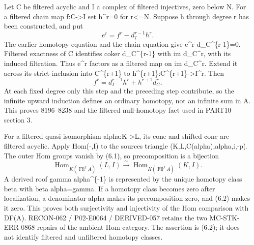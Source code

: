 \documentclass[11pt]{article}
\begin{document}
Let C be filtered acyclic and I a complex of filtered injectives,\allowbreak{} zero below N. For a filtered chain map f:\allowbreak{}C\allowbreak{}->I set h\textasciicircum{}r\allowbreak{}=0 for r<\allowbreak{}=N. Suppose h through degree r has been constructed,\allowbreak{} and put \[
 e^r=f^r-d_I^{r-1}h^r.
\] The earlier homotopy equation and the chain equation give e\^{}r d\_\allowbreak{}C\textasciicircum{}\{r-1\}\allowbreak{}=0. Filtered exactness of C identifies coker d\_\allowbreak{}C\textasciicircum{}\{r-1\} with im d\_\allowbreak{}C\textasciicircum{}r,\allowbreak{} with its induced filtration. Thus e\^{}r factors as a filtered map on im d\_\allowbreak{}C\textasciicircum{}r. Extend it across its strict inclusion into C\textasciicircum{}\{r\allowbreak{}+1\} to h\textasciicircum{}\{r\allowbreak{}+1\}:\allowbreak{}C\textasciicircum{}\{r\allowbreak{}+1\}\allowbreak{}->I\textasciicircum{}r. Then \[
 f^r=d_I^{r-1}h^r+h^{r+1}d_C^r.                              \tag{6.1}
\] At each fixed degree only this step and the preceding step contribute,\allowbreak{} so the infinite upward induction defines an ordinary homotopy,\allowbreak{} not an infinite sum in A. This proves 8196–\allowbreak{}8238 and the filtered null-homotopy fact used in PART10 section 3.

For a filtered quasi-isomorphism alpha:\allowbreak{}K\allowbreak{}->L,\allowbreak{} its cone and shifted cone are filtered acyclic. Apply Hom(-,\allowbreak{}I)\allowbreak{} to the source\textquotesingle s triangle (K,\allowbreak{}L,\allowbreak{}C(alpha)\allowbreak{},\allowbreak{}alpha,\allowbreak{}i,\allowbreak{}-p)\allowbreak{}. The outer Hom groups vanish by (6.1)\allowbreak{},\allowbreak{} so precomposition is a bijection \[
 \operatorname{Hom}_{K(\operatorname{Fil}^f A)}(L,I)
 \xrightarrow{\sim}
 \operatorname{Hom}_{K(\operatorname{Fil}^f A)}(K,I).           \tag{6.2}
\] A derived roof gamma alpha\^{}\{-1\} is represented by the unique homotopy class beta with beta alpha\allowbreak{}=gamma. If a homotopy class becomes zero after localization,\allowbreak{} a denominator alpha makes its precomposition zero,\allowbreak{} and (6.2)\allowbreak{} makes it zero. This proves both surjectivity and injectivity of the Hom comparison with DF(A)\allowbreak{}. RECON-062 /\allowbreak{} P02-E0064 /\allowbreak{} DERIVED-057 retains the two MC-STK-ERR-0868 repairs of the ambient Hom category. The assertion is (6.2)\allowbreak{}; it does not identify filtered and unfiltered homotopy classes.
\end{document}
